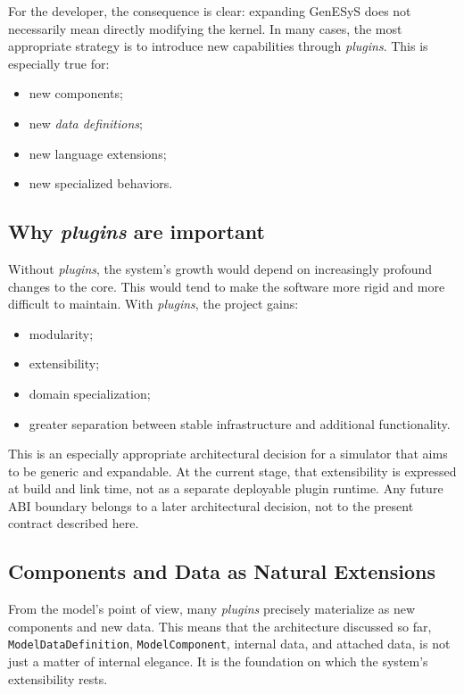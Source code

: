 For the developer, the consequence is clear: expanding GenESyS does not necessarily mean directly modifying the kernel. In many cases, the most appropriate strategy is to introduce new capabilities through \textit{plugins}. This is especially true for:
\begin{itemize}
 \item new components;
 \item new \textit{data definitions};
 \item new language extensions;
 \item new specialized behaviors.
\end{itemize}

\subsection{Why \textit{plugins} are important}
\label{subsec:cap8_por_que_plugins_importantes}

Without \textit{plugins}, the system's growth would depend on increasingly profound changes to the core. This would tend to make the software more rigid and more difficult to maintain. With \textit{plugins}, the project gains:
\begin{itemize}
 \item modularity;
 \item extensibility;
 \item domain specialization;
 \item greater separation between stable infrastructure and additional functionality.
\end{itemize}

This is an especially appropriate architectural decision for a simulator that aims to be generic and expandable. At the current stage, that extensibility is expressed at build and link time, not as a separate deployable plugin runtime. Any future ABI boundary belongs to a later architectural decision, not to the present contract described here.

\subsection{Components and Data as Natural Extensions}
\label{subsec:cap8_componentes_dados_extensoes_naturais}

From the model's point of view, many \textit{plugins} precisely materialize as new components and new data. This means that the architecture discussed so far, \texttt{ModelDataDefinition}, \texttt{ModelComponent}, internal data, and attached data, is not just a matter of internal elegance. It is the foundation on which the system's extensibility rests.

